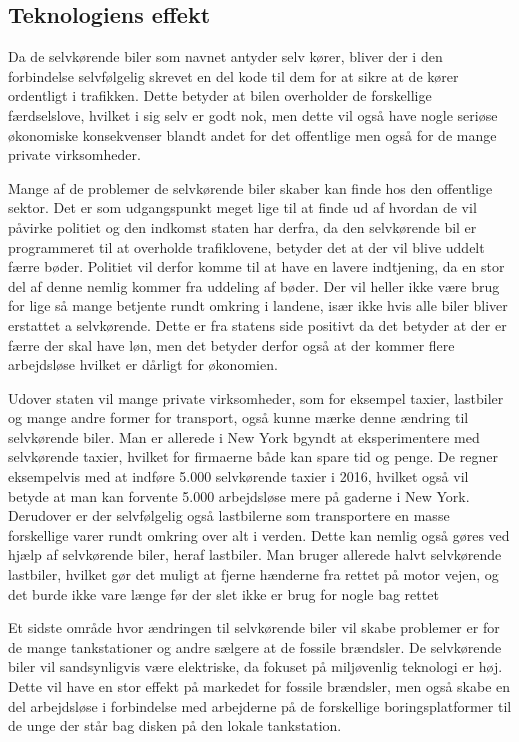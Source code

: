 \subsection{Teknologiens effekt}
Da de selvkørende biler som navnet antyder selv kører, bliver der i den forbindelse selvfølgelig skrevet en del kode til dem for at sikre at de kører ordentligt i trafikken. Dette betyder at bilen overholder de forskellige færdselslove, hvilket i sig selv er godt nok, men dette vil også have nogle seriøse økonomiske konsekvenser blandt andet for det offentlige men også for de mange private virksomheder. 

Mange af de problemer de selvkørende biler skaber kan finde hos den offentlige sektor. Det er som udgangspunkt meget lige til at finde ud af hvordan de vil påvirke politiet og den indkomst staten har derfra, da den selvkørende bil er programmeret til at overholde trafiklovene, betyder det at der vil blive uddelt færre bøder. Politiet vil derfor komme til at have en lavere indtjening, da en stor del af denne nemlig kommer fra uddeling af bøder\cite{B}. Der vil heller ikke være brug for lige så mange betjente rundt omkring i landene, især ikke hvis alle biler bliver erstattet a selvkørende. Dette er fra statens side positivt da det betyder at der er færre der skal have løn, men det betyder derfor også at der kommer flere arbejdsløse hvilket er dårligt for økonomien.

Udover staten vil mange private virksomheder, som for eksempel taxier, lastbiler og mange andre former for transport, også kunne mærke denne ændring til selvkørende biler. Man er allerede i New York bgyndt at eksperimentere med selvkørende taxier, hvilket for firmaerne både kan spare tid og penge. De regner eksempelvis med at indføre 5.000 selvkørende taxier i 2016, hvilket også vil betyde at man kan forvente 5.000 arbejdsløse mere på gaderne i New York. Derudover er der selvfølgelig også lastbilerne som transportere en masse forskellige varer rundt omkring over alt i verden. Dette kan nemlig også gøres ved hjælp af selvkørende biler, heraf lastbiler. Man bruger allerede halvt selvkørende lastbiler, hvilket gør det muligt at fjerne hænderne fra rettet på motor vejen, og det burde ikke vare længe før der slet ikke er brug for nogle bag rettet

Et sidste område hvor ændringen til selvkørende biler vil skabe problemer er for de mange tankstationer og andre sælgere at de fossile brændsler. De selvkørende biler vil sandsynligvis være elektriske, da fokuset på miljøvenlig teknologi er høj. Dette vil have en stor effekt på markedet for fossile brændsler, men også skabe en del arbejdsløse i forbindelse med arbejderne på de forskellige boringsplatformer til de unge der står bag disken på den lokale tankstation.

